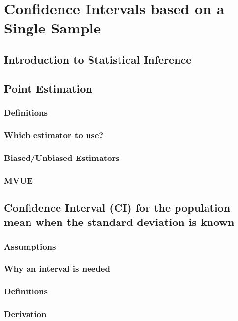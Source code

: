 \chapter{Confidence Intervals based on a Single Sample}  %

\section{Introduction to Statistical Inference}  %

\section{Point Estimation}  %
    \subsection{Definitions}  %
    \subsection{Which estimator to use?}  %
    \subsection{Biased/Unbiased Estimators}  %
    \subsection{MVUE}  %

\section{Confidence Interval (CI) for the population mean when the standard deviation is known}  %
    \subsection{Assumptions}  %
    \subsection{Why an interval is needed}  %
    \subsection{Definitions}  %
    \subsection{Derivation}  %
